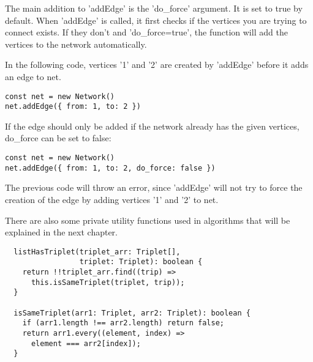 The main addition to 'addEdge' is the 'do\_force' argument.
It is set to true by default.
When 'addEdge' is called, it first checks if the vertices you are trying to connect exists.
If they don't and 'do\_force=true', the function will add the vertices to the network automatically.

In the following code, vertices '1' and '2' are created by 'addEdge' before it adds an edge to net.

\begin{verbatim}
const net = new Network()
net.addEdge({ from: 1, to: 2 })
\end{verbatim}

If the edge should only be added if the network already has the given vertices, do\_force can be set to false:

\begin{verbatim}
const net = new Network()
net.addEdge({ from: 1, to: 2, do_force: false })
\end{verbatim}

The previous code will throw an error, since 'addEdge' will not try to force the creation of the edge by
adding vertices '1' and '2' to net.

There are also some private utility functions used in algorithms
that will be explained in the next chapter.

\begin{verbatim}
  listHasTriplet(triplet_arr: Triplet[],
                 triplet: Triplet): boolean {
    return !!triplet_arr.find((trip) =>
      this.isSameTriplet(triplet, trip));
  }

  isSameTriplet(arr1: Triplet, arr2: Triplet): boolean {
    if (arr1.length !== arr2.length) return false;
    return arr1.every((element, index) =>
      element === arr2[index]);
  }
\end{verbatim}
